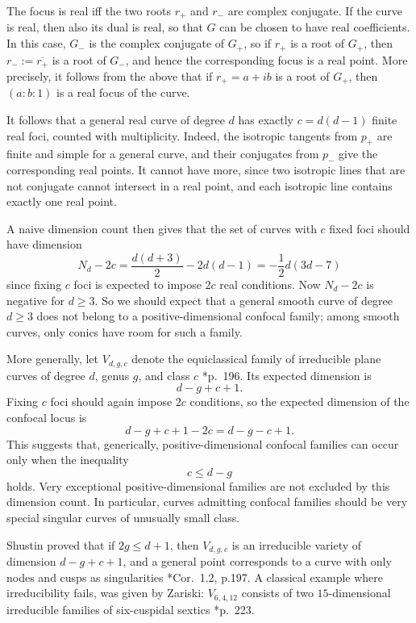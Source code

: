 \documentclass[11pt]{amsart}
\theoremstyle{definition}
\theoremstyle{remark}
\begin{document}
The focus is real iff the two roots $r_+$ and $r_-$ are complex conjugate. 
If the curve is real, then also its dual is real, so that $G$ can be chosen to have real coefficients. In this case, $G_-$ is the complex conjugate of $G_+$, so if $r_+$ is a root of $G_+$, then $r_-:=\overline{r_+}$ is a root of $G_-$, and hence the corresponding focus is a real point. More precisely, it follows from the above that if $r_+=a+ib$ is a root of $G_+$, then $(a:b:1)$ is a real focus of the curve.


It follows that a general real curve of degree $d$ has exactly $c=d(d-1)$ finite real foci, counted with multiplicity. Indeed, the isotropic tangents from $p_+$ are finite and simple for a general curve, and their conjugates from $p_-$ give the corresponding real points. It cannot have more, since two isotropic lines that are not conjugate cannot intersect in a real point, and each isotropic line contains exactly one real point.

A naive dimension count then gives that the set of curves with $c$ fixed foci should have dimension
\[
N_d-2c=\frac{d(d+3)}{2}-2d(d-1)=-\frac{1}{2}d(3d-7)
\]
since fixing \(c\) foci is expected to impose \(2c\) real conditions.
Now  $N_d-2c$ is negative for $d\ge 3$. So we should expect that a general smooth curve of degree $d\ge 3$ does not belong to a positive-dimensional confocal family; among smooth curves, only conics have room for such a family.

More generally, let $V_{d,g,c}$ denote the equiclassical family of irreducible plane curves of degree $d$, genus $g$, and class $c$ \cite{Sh98}*{p.~196}. Its expected dimension is
\[
d-g+c+1.
\]
Fixing $c$ foci should again impose $2c$ conditions, so the expected dimension of the confocal locus is
\[
d-g+c+1-2c=d-g-c+1.
\]
This suggests that, generically, positive-dimensional confocal families can occur only when the inequality 
\[
c\le d-g
\]
holds. Very exceptional positive-dimensional families are not excluded by this dimension count. 
In particular, curves admitting confocal families should be very special singular curves of unusually small class.
\medskip

Shustin proved that if $2g\le d+1$, then $V_{d,g,c}$ is an irreducible variety of dimension $d-g+c+1$, and a general point corresponds to a curve with only nodes and cusps as singularities \cite{Sh98}*{Cor.~1.2, p.197}. A classical example where irreducibility fails, was given by Zariski:  $V_{6,4,12}$ consists of two $15$-dimensional irreducible families of six-cuspidal sextics  \cite{Za}*{p.~223}.
\end{document}
